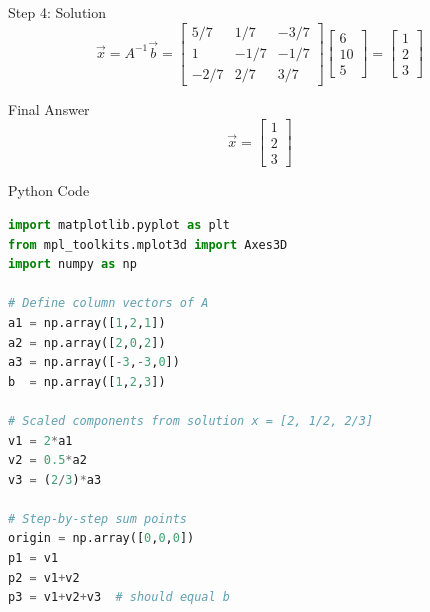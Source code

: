 \documentclass{beamer}
\begin{document}
\begin{frame}{Step 4: Solution}
\[
\vec{x} = A^{-1}\vec{b} =
\begin{bmatrix}
5/7 & 1/7 & -3/7 \\
1 & -1/7 & -1/7 \\
-2/7 & 2/7 & 3/7
\end{bmatrix}
\begin{bmatrix}
6 \\ 10 \\ 5
\end{bmatrix}
=
\begin{bmatrix}
1 \\ 2 \\ 3
\end{bmatrix} \tag{4}
\]
\end{frame}


\begin{frame}{Final Answer}
\[
\boxed{ \vec{x} = \begin{bmatrix} 1 \\ 2 \\ 3 \end{bmatrix} }
\]
\end{frame}


\begin{frame}[fragile]{Python Code}
\begin{lstlisting}[language=Python]
import matplotlib.pyplot as plt
from mpl_toolkits.mplot3d import Axes3D
import numpy as np

# Define column vectors of A
a1 = np.array([1,2,1])
a2 = np.array([2,0,2])
a3 = np.array([-3,-3,0])
b  = np.array([1,2,3])

# Scaled components from solution x = [2, 1/2, 2/3]
v1 = 2*a1
v2 = 0.5*a2
v3 = (2/3)*a3

# Step-by-step sum points
origin = np.array([0,0,0])
p1 = v1
p2 = v1+v2
p3 = v1+v2+v3  # should equal b


\end{lstlisting}
\end{frame}
\end{document}
